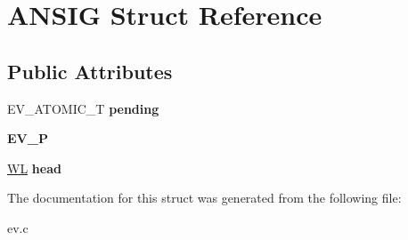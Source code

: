 \hypertarget{struct_a_n_s_i_g}{}\section{A\+N\+S\+IG Struct Reference}
\label{struct_a_n_s_i_g}
\subsection*{Public Attributes}
\begin{DoxyCompactItemize}
\item 
\hypertarget{struct_a_n_s_i_g_a989fa99301ecc95e7e8f6084cec5519a}{}\label{struct_a_n_s_i_g_a989fa99301ecc95e7e8f6084cec5519a} 
E\+V\+\_\+\+A\+T\+O\+M\+I\+C\+\_\+T {\bfseries pending}
\item 
\hypertarget{struct_a_n_s_i_g_a705ea8659265dbaff1cd13f43014c655}{}\label{struct_a_n_s_i_g_a705ea8659265dbaff1cd13f43014c655} 
{\bfseries E\+V\+\_\+P}
\item 
\hypertarget{struct_a_n_s_i_g_a4c6de0ed8a0199bbb4c6ef00ccf01546}{}\label{struct_a_n_s_i_g_a4c6de0ed8a0199bbb4c6ef00ccf01546} 
\hyperlink{structev__watcher__list}{WL} {\bfseries head}
\end{DoxyCompactItemize}


The documentation for this struct was generated from the following file\+:\begin{DoxyCompactItemize}
\item 
ev.\+c\end{DoxyCompactItemize}
